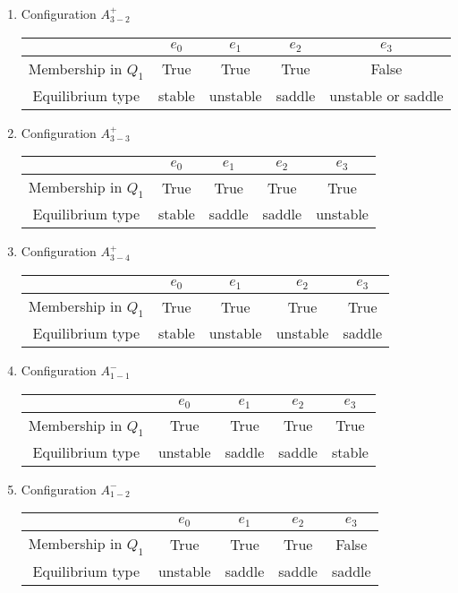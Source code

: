 \documentclass{amsart}
\theoremstyle{definition}
\numberwithin{equation}{section}
\begin{document}
\begin{enumerate}
\item Configuration $A_{3-2}^+$

 \medskip
 \begin{tabular}[hc]{|c|c|c|c|c|}
\hline
& $e_0$ & $e_1$ & $e_2$ & $e_3$ \\
\hline
Membership in $Q_1$ & True & True & True & False\\
\hline
Equilibrium type & stable & unstable & saddle & unstable or saddle \\
\hline
\end{tabular}
\medskip


 \item Configuration $A_{3-3}^+$

 \medskip
 \begin{tabular}[hc]{|c|c|c|c|c|}
\hline
& $e_0$ & $e_1$ & $e_2$ & $e_3$ \\
\hline
Membership in $Q_1$ & True & True & True &True\\
\hline
Equilibrium type & stable & saddle & saddle & unstable \\
\hline
\end{tabular}
\medskip

 \item Configuration $A_{3-4}^+$

 \medskip
 \begin{tabular}[hc]{|c|c|c|c|c|}
\hline
& $e_0$ & $e_1$ & $e_2$ & $e_3$ \\
\hline
Membership in $Q_1$ & True & True & True &True\\
\hline
Equilibrium type & stable & unstable & unstable & saddle \\
\hline
\end{tabular}
\medskip


\item Configuration $A_{1-1}^-$

 \medskip
 \begin{tabular}[hc]{|c|c|c|c|c|}
\hline
& $e_0$ & $e_1$ & $e_2$ & $e_3$ \\
\hline
Membership in $Q_1$ & True & True & True &True\\
\hline
Equilibrium type & unstable & saddle & saddle & stable\\
\hline
\end{tabular}
\medskip

 \item Configuration $A_{1-2}^-$


 \medskip
 \begin{tabular}[hc]{|c|c|c|c|c|}
\hline
& $e_0$ & $e_1$ & $e_2$ & $e_3$ \\
\hline
Membership in $Q_1$ & True & True & True & False\\
\hline
Equilibrium type & unstable & saddle & saddle & saddle \\
\hline
\end{tabular}
\medskip 


\end{enumerate}
\end{document}
